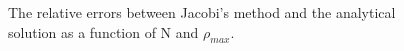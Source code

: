 \documentclass[%
reprint,
amsmath,amssymb,
aps,
]{revtex4-1}
\begin{document}
\begin{figure}[!h]
	\noindent{}
\end{figure}
\begin{figure}[!h]
	\noindent{}
\caption{The relative errors between Jacobi's method and the analytical solution as a function of N and $\rho_{max}$. } \label{Nrho} 
\end{figure}
\end{document}
